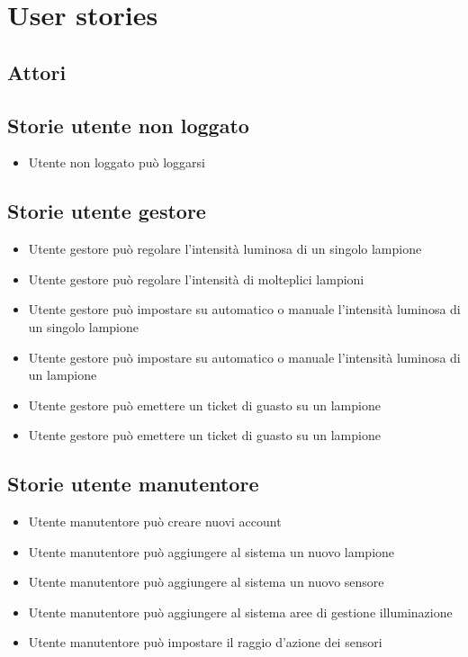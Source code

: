 \chapter{User stories}

\section{Attori}\label{attori}

\section{Storie utente non loggato}

\begin{itemize}
    \item Utente non loggato può loggarsi
\end{itemize}

\section{Storie utente gestore}

\begin{itemize}
    \item Utente gestore può regolare l'intensità luminosa di un singolo lampione
    \item Utente gestore può regolare l'intensità di molteplici lampioni
    \item Utente gestore può impostare su automatico o manuale l'intensità luminosa di un singolo lampione
    \item Utente gestore può impostare su automatico o manuale l'intensità luminosa di un lampione
    \item Utente gestore può emettere un ticket di guasto su un lampione
    \item Utente gestore può emettere un ticket di guasto su un lampione
\end{itemize}



\section{Storie utente manutentore}
\begin{itemize}
    \item Utente manutentore può creare nuovi account
    \item Utente manutentore può aggiungere al sistema un nuovo lampione
    \item Utente manutentore può aggiungere al sistema un nuovo sensore
    \item Utente manutentore può aggiungere al sistema aree di gestione illuminazione
    \item Utente manutentore può impostare il raggio d'azione dei sensori
\end{itemize}


